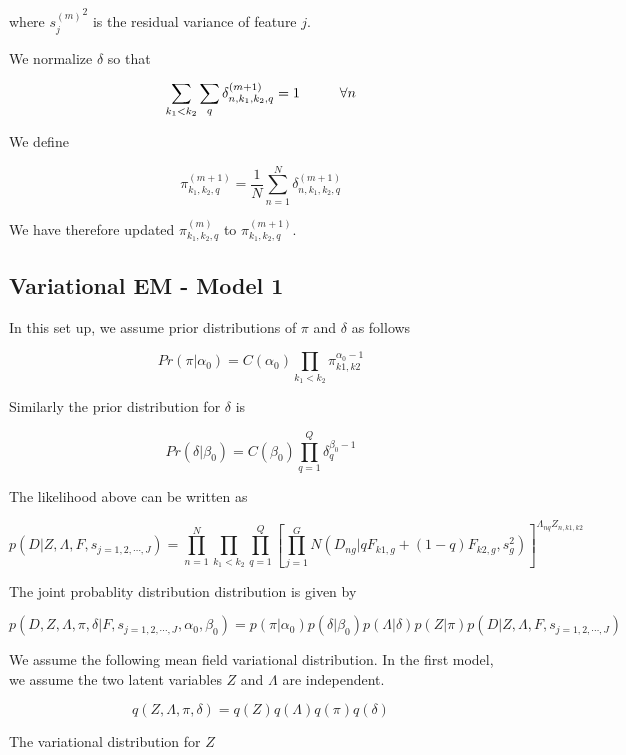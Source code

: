 \documentclass[12pt]{article}
\begin{document}
where ${s_j^{(m)}}^2$ is the residual variance of feature $j$.

We normalize $\delta$ so that 

$$ \sum_{k_1 < k_2} \sum_{q} \delta^{(m+1)}_{n, k_1, k_2, q} = 1 \hspace{1 cm} \forall n $$

We define 

$$ \pi^{(m+1)}_{k_1, k_2, q} = \frac{1}{N}\sum_{n=1}^{N} \delta^{(m+1)}_{n, k_1, k_2, q} $$


We have therefore updated $\pi^{(m)}_{k_1, k_2, q}$ to $\pi^{(m+1)}_{k_1, k_2, q}$.


\subsection{Variational EM  - Model 1}

In this set up, we assume prior distributions of $\pi$ and $\delta$ as follows

$$ Pr (\pi | \alpha_{0}) = C (\alpha_0) \prod_{k_1 < k_2} \pi_{k1, k2}^{\alpha_0 -1} $$

Similarly the prior distribution for $\delta$ is 

$$ Pr (\delta | \beta_0) = C (\beta_0) \prod_{q=1}^{Q} \delta_{q}^{\beta_0 -1 }  $$

The likelihood above can be written as 

$$ p (D | Z, \Lambda, F, s_{j=1,2,\cdots,J}) = \prod_{n=1}^{N} \prod_{k_1 < k_2} \prod_{q=1}^{Q} [ \prod_{j=1}^{G} N (D_{ng} | qF_{k1,g} + (1-q)F_{k2,g}, s^2_{g})]^{\Lambda_{nq}Z_{n,k1,k2}} $$

The joint probablity distribution distribution is given by 

$$ p (D, Z, \Lambda, \pi, \delta | F, s_{j=1,2,\cdots,J}, \alpha_{0}, \beta_{0}) = p (\pi | \alpha_0) p (\delta | \beta_0)  p (\Lambda | \delta) p (Z | \pi) p (D | Z, \Lambda, F, s_{j=1,2,\cdots,J})  $$


We assume the following mean field variational distribution. In the first model, we assume the two latent variables $Z$ and $\Lambda$ are independent. 

$$ q(Z, \Lambda, \pi, \delta) = q(Z) q(\Lambda) q(\pi) q(\delta) $$

The variational distribution for $Z$
\end{document}
